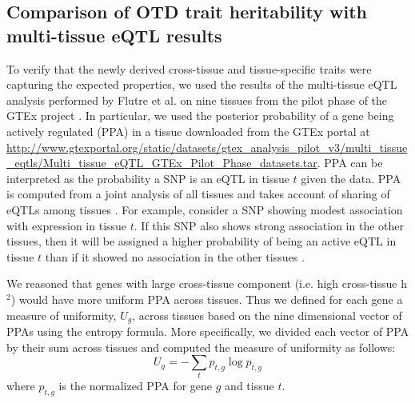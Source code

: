 \documentclass[10pt,letterpaper]{article}
\begin{document}
\subsection*{Comparison of OTD trait heritability with multi-tissue eQTL
results}\label{comparison-of-otd-pve-to-multi-tissue-eqtl-results}

To verify that the newly derived cross-tissue and tissue-specific traits were capturing the expected properties, we used the results of the multi-tissue eQTL analysis performed by Flutre et al. \cite{Flutre_2013}
on nine tissues from the pilot phase of the GTEx project \cite{Ardlie_2015}. %
In particular, we used the posterior probability of a gene being actively regulated (PPA) in a tissue downloaded from the GTEx portal at \url{http://www.gtexportal.org/static/datasets/gtex_analysis_pilot_v3/multi_tissue_eqtls/Multi_tissue_eQTL_GTEx_Pilot_Phase_datasets.tar}. PPA can be interpreted as
the probability a SNP is an eQTL in tissue \(t\) given the data. PPA is computed from a joint analysis of all tissues and takes account of sharing of eQTLs among tissues \cite{Flutre_2013}. For example, consider a SNP showing modest association with expression in tissue \(t\). If this SNP also shows strong association in the other tissues, then it will be assigned a higher probability of being an active eQTL in tissue \(t\) than if it showed no association in the other tissues \cite{Flutre_2013}.

We reasoned that genes with large cross-tissue component (i.e. high cross-tissue h$^2$) would have more uniform PPA across tissues. Thus we defined for each gene a measure of uniformity, $U_g$, across tissues based on the nine dimensional vector of PPAs using the entropy formula. More specifically, we divided each vector of PPA by their sum across tissues and computed the measure of uniformity as follows:
\[ U_g = -\sum_{t}p_{t,g} \log p_{t,g} \]
%
where \(p_{t,g}\) is the normalized PPA for gene $g$ and tissue $t$.
\end{document}
